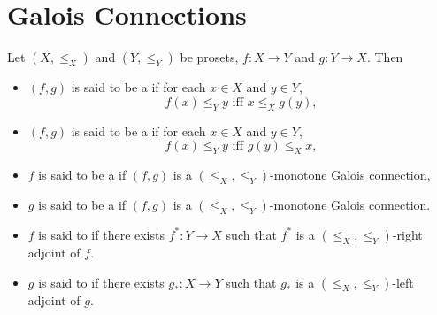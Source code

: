 \documentclass{book}
\begin{document}
	
	
	
	
	
	
	
	
	
	
	
	
	
	
	
	
	
	
	
	
	
	
	
	
	
	
	
	
	
	
	
	
	
	
	
	
	
	
	
	
	
	
	
	
	
	
	
	
	
	
	
	
	
	
	
	\newpage
	\section{Galois Connections}
	
	
	\begin{defn} 
		Let $(X, \leq_X)$ and $(Y, \leq_Y)$ be prosets, $f: X \rightarrow Y$ and $g:Y \rightarrow X$. Then
		\begin{itemize}
			\item $(f, g)$ is said to be a  if for each $x \in X$ and $y \in Y$, 
			$$\text{$f(x) \leq_Y y$ iff $x \leq_X g(y)$,}$$
			\item $(f, g)$ is said to be a  if for each $x \in X$ and $y \in Y$, 
			$$\text{$f(x) \leq_Y y$ iff $g(y) \leq_X x$,}$$
			\item $f$ is said to be a  if $(f,g)$ is a $(\leq_X, \leq_Y)$-monotone Galois connection,
			\item $g$ is said to be a  if $(f,g)$ is a $(\leq_X, \leq_Y)$-monotone Galois connection.
			\item $f$ is said to  if there exists $f^*:Y \rightarrow X$ such that $f^*$ is a $(\leq_X, \leq_Y)$-right adjoint of $f$.
			\item $g$ is said to  if there exists $g_*:X \rightarrow Y$ such that $g_*$ is a $(\leq_X, \leq_Y)$-left adjoint of $g$.
		\end{itemize}
	\end{defn}
	
\end{document}
